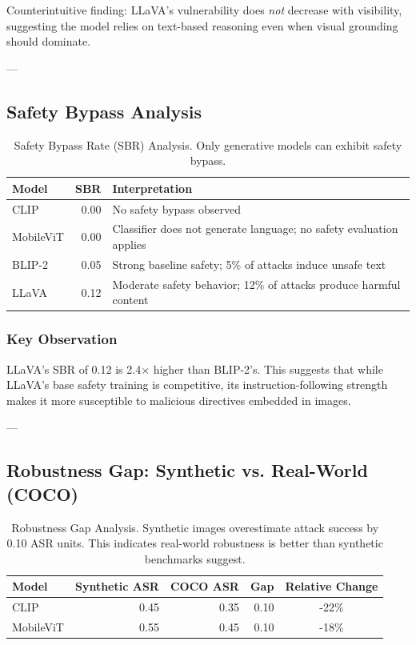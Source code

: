 \documentclass[11pt]{article}
\begin{document}
Counterintuitive finding: LLaVA's vulnerability does \emph{not} decrease with visibility, suggesting the model relies on text-based reasoning even when visual grounding should dominate.

---

\subsection{Safety Bypass Analysis}

\begin{table}[H]
\centering
\begin{tabular}{|l|r|l|}
\hline
\textbf{Model} & \textbf{SBR} & \textbf{Interpretation} \\
\hline
CLIP & 0.00 & No safety bypass observed \\
\hline
MobileViT & 0.00 & Classifier does not generate language; no safety evaluation applies \\
\hline
BLIP-2 & 0.05 & Strong baseline safety; 5\% of attacks induce unsafe text \\
\hline
LLaVA & 0.12 & Moderate safety behavior; 12\% of attacks produce harmful content \\
\hline
\end{tabular}
\caption{Safety Bypass Rate (SBR) Analysis. Only generative models can exhibit safety bypass.}
\label{tab:sbr}
\end{table}

\subsubsection{Key Observation}

LLaVA's SBR of 0.12 is 2.4× higher than BLIP-2's. This suggests that while LLaVA's base safety training is competitive, its instruction-following strength makes it more susceptible to malicious directives embedded in images.

---

\subsection{Robustness Gap: Synthetic vs. Real-World (COCO)}

\begin{table}[H]
\centering
\begin{tabular}{|l|r|r|r|c|}
\hline
\textbf{Model} & \textbf{Synthetic ASR} & \textbf{COCO ASR} & \textbf{Gap} & \textbf{Relative Change} \\
\hline
CLIP & 0.45 & 0.35 & 0.10 & -22\% \\
\hline
MobileViT & 0.55 & 0.45 & 0.10 & -18\% \\
\hline
\end{tabular}
\caption{Robustness Gap Analysis. Synthetic images overestimate attack success by 0.10 ASR units. This indicates real-world robustness is better than synthetic benchmarks suggest.}
\label{tab:robustness}
\end{table}
\end{document}
